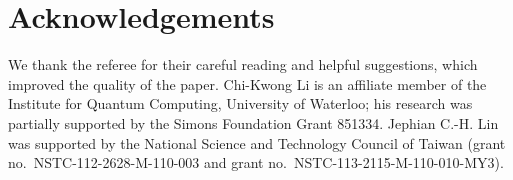 \documentclass{article}
\theoremstyle{definition}
\begin{document}
\section*{Acknowledgements}
We thank the referee for their careful reading and
helpful suggestions, which improved the quality of the paper.
Chi-Kwong Li is an affiliate member of the Institute for Quantum Computing, University of Waterloo;
 his research was partially supported by the Simons Foundation Grant 851334.
Jephian C.-H. Lin was supported by the National Science and Technology Council of Taiwan (grant no.\ NSTC-112-2628-M-110-003 and grant no.\ NSTC-113-2115-M-110-010-MY3).



% 
\end{document}
